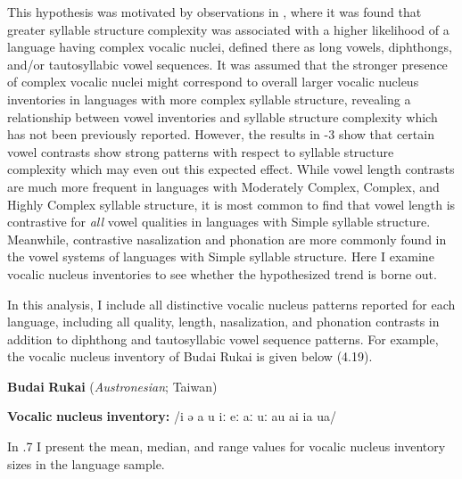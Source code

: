   This hypothesis was motivated by observations in , where it was found that greater syllable structure complexity was associated with a higher likelihood of a language having complex vocalic nuclei, defined there as long vowels, diphthongs, and/or tautosyllabic vowel sequences. It was assumed that the stronger presence of complex vocalic nuclei might correspond to overall larger vocalic nucleus inventories in languages with more complex syllable structure, revealing a relationship between vowel inventories and syllable structure complexity which has not been previously reported. However, the results in -3 show that certain vowel contrasts show strong patterns with respect to syllable structure complexity which may even out this expected effect. While vowel length contrasts are much more frequent in languages with Moderately Complex, Complex, and Highly Complex syllable structure, it is most common to find that vowel length is contrastive for \textit{all} vowel qualities in languages with Simple syllable structure. Meanwhile, contrastive nasalization and phonation are more commonly found in the vowel systems of languages with Simple syllable structure. Here I examine vocalic nucleus inventories to see whether the hypothesized trend is borne out.



  In this analysis, I include all distinctive vocalic nucleus patterns reported for each language, including all quality, length, nasalization, and phonation contrasts in addition to diphthong and tautosyllabic vowel sequence patterns. For example, the vocalic nucleus inventory of Budai Rukai is given below (4.19).



\ea\label{ex:(4.19)}
   \textbf{Budai} \textbf{Rukai} (\textit{Austronesian}; Taiwan)



\textbf{Vocalic} \textbf{nucleus} \textbf{inventory:} /i ə a u iː eː aː uː au ai ia ua/



  In .7 I present the mean, median, and range values for vocalic nucleus inventory sizes in the language sample.






